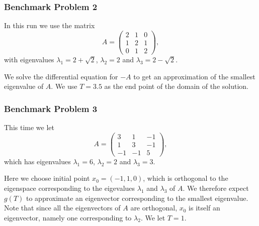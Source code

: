 \subsubsection{Benchmark Problem 2}\label{sec:benchmark problem 2}
In this run we use the matrix
\begin{equation}\label{eq:33mat2}
    A = \left(\begin{array}{ccc}
        2 & 1 & 0 \\
        1 & 2 & 1 \\
        0 & 1 & 2
    \end{array}\right),
\end{equation}
with eigenvalues $\lambda_1 = 2+\sqrt{2}$, $\lambda_2 = 2$ and $\lambda_3 = 2-\sqrt{2}$.

We solve the differential equation for $-A$ to get an approximation of the smallest eigenvalue of $A$. We use $T=3.5$ as the end point of the domain of the solution.

\subsubsection{Benchmark Problem 3}\label{sec:benchmark problem 3}
This time we let
\begin{equation}\label{eq:33mat2}
    A = \left(\begin{array}{ccc}
        3 & 1 & -1 \\
        1 & 3 & -1 \\
        -1 & -1 & 5
    \end{array}\right),
\end{equation}
which has eigenvalues $\lambda_1 = 6$, $\lambda_2 = 2$ and $\lambda_3 = 3$.

Here we choose initial point $x_0=(-1, 1, 0)$, which is orthogonal to the eigenspace corresponding to the eigevalues $\lambda_1$ and $\lambda_3$ of $A$. We therefore expect $g(T)$ to approximate an eigenvector corresponding to the smallest eigenvalue. Note that since all the eigenvectors of $A$ are orthogonal, $x_0$ is itself an eigenvector, namely one corresponding to $\lambda_2$. We let $T=1$.

